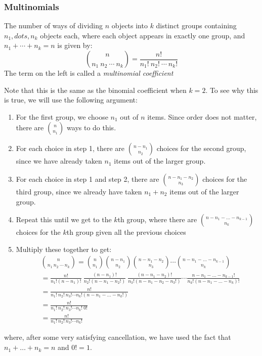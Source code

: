 \documentclass[12pt]{article}
\theoremstyle{definition}
\theoremstyle{remark}
\begin{document}
\subsubsection{Multinomials}
\begin{framed}
The number of ways of dividing $n$ objects into $k$ distinct groups containing $n_1, dots, n_k$ objects each, where each object appears in exactly one group, and $n_1 + \cdots + n_k = n$ is given by:
\[
\binom{n}{n_1 \: n_2\: \cdots \:n_k} = \frac{n!}{n_1!\:n_2!\:\cdots\:n_k!}
\]
The term on the left is called a \emph{multinomial coefficient}
\end{framed}
Note that this is the same as the binomial coefficient when $k = 2$. To see why this is true, we will use the following argument:
\begin{enumerate}
\item For the first group, we choose $n_1$ out of $n$ items. Since order does not matter, there are $\binom{n}{n_1}$ ways to do this.
\item For each choice in step 1, there are $\binom{n - n_1}{n_2}$ choices for the second group, since we have already taken $n_1$ items out of the larger group.
\item For each choice in step 1 and step 2, there are $\binom{n - n_1 - n_2}{n_3}$ choices for the third group, since we already have taken $n_1 + n_2$ items out of the larger group.
\item Repeat this until we get to the $k$th group, where there are $\binom{n - n_1 - \dots - n_{k-1}}{n_k}$ choices for the $k$th group given all the previous choices
\item Multiply these together to get:
\begin{align*}
&\binom{n}{n_1 \: n_2\: \cdots \:n_k} = \binom{n}{n_1} \binom{n - n_1}{n_2} \binom{n - n_1 - n_2}{n_3} \cdots \binom{n - n_1 - \dots - n_{k-1}}{n_k} \\
&= \frac{n!}{n_1! (n - n_1)!}\:\frac{(n - n_1)!}{n_2!(n - n_1 - n_2!)}\:\frac{(n - n_1 - n_2)!}{n_3!(n - n_1 - n_2 - n_3!)}\cdots\frac{n - n_1 - \dots - n_{k-1}!}{n_k! (n - n_1 - \dots - n_k)!}\\
&= \frac{n!}{n_1! \: n_2! \: n_3! \cdots n_k! (n - n_1 - \dots - n_k! )} \\
&= \frac{n!}{n_1! \: n_2! \: n_3! \cdots n_k! \: 0! } \\
&= \frac{n!}{n_1! \: n_2! \: n_3! \cdots n_k! }
\end{align*}
\end{enumerate}
where, after some very satisfying cancellation, we have used the fact that $n_1 + \dots + n_k = n$ and $0! = 1$.\\
\end{document}
